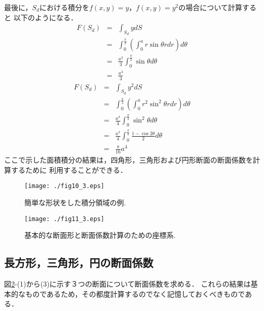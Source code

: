 \documentclass[10pt,a4j]{jarticle}
\begin{document}
最後に，$S_d$における積分を$f(x,y)=y$，$f(x,y)=y^2$の場合について計算すると
以下のようになる．
\begin{eqnarray}
	F(S_d) 
	&=& \int_{S_d} y dS \nonumber \\
	&=& \int_0^\frac{\pi}{2} \left( \int_0^a r\sin\theta rdr \right)d\theta \nonumber \\
	&=& \frac{a^3}{3}\int_0^\frac{\pi}{2} \sin\theta  d\theta \nonumber \\
	&=& \frac{a^3}{3}
	\label{eqn:int_Sd_y}
\end{eqnarray}
\begin{eqnarray}
	F(S_d) 
	&=& \int_{S_d} y^2 dS \nonumber \\
	&=& \int_0^\frac{\pi}{2} \left( \int_0^a r^2\sin^2\theta rdr \right)d\theta \nonumber \\
	&=& \frac{a^4}{4}\int_0^\frac{\pi}{2} \sin^2\theta d\theta \nonumber \\
	&=& \frac{a^4}{4} \int_0^\frac{\pi}{2} \frac{1-\cos 2\theta}{2} d\theta 
	\nonumber
	\\
	&=& \frac{\pi}{16}a^4
	\label{eqn:int_Sd_y2}
\end{eqnarray}
ここで示した面積積分の結果は，四角形，三角形および円形断面の断面係数を計算するために
利用することができる．
\begin{figure}[h]
	\begin{center}
	\texttt{[image: ./fig10\_3.eps]} 
	\end{center}
	\caption{
		簡単な形状をした積分領域の例. 
	} 
	\label{fig:fig10_3}
\end{figure}
\begin{figure}[h]
	\begin{center}
	\texttt{[image: ./fig11\_3.eps]} 
	\end{center}
	\caption{
		基本的な断面形と断面係数計算のための座標系.
	} 
	\label{fig:fig11_3}
\end{figure}
\subsection{長方形，三角形，円の断面係数}
図\ref{fig:fig11_3}-(1)から(3)に示す３つの断面について断面係数を求める．
これらの結果は基本的なものであるため，その都度計算するのでなく記憶しておくべきものである．
\end{document}
